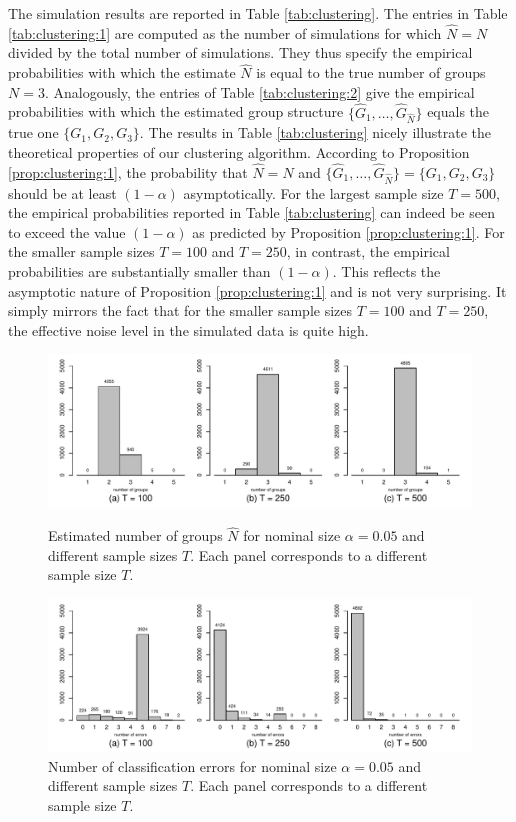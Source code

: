 \documentclass[a4paper,12pt]{article}
\begin{document}
The simulation results are reported in Table \ref{tab:clustering}. The entries in Table \ref{tab:clustering:1} are computed as the number of simulations for which $\widehat{N} = N$ divided by the total number of simulations. They thus specify the empirical probabilities with which the estimate $\widehat{N}$ is equal to the true number of groups $N = 3$. Analogously, the entries of Table \ref{tab:clustering:2} give the empirical probabilities with which the estimated group structure $\{ \widehat{G}_1,\ldots,\widehat{G}_{\widehat{N}}\}$ equals the true one $\{G_1,G_2,G_3\}$. The results in Table \ref{tab:clustering} nicely illustrate the theoretical properties of our clustering algorithm. According to Proposition \ref{prop:clustering:1}, the probability that $\widehat{N} = N$ and $\{ \widehat{G}_1,\ldots,\widehat{G}_{\widehat{N}}\} = \{G_1,G_2,G_3\}$ should be at least $(1-\alpha)$ asymptotically. For the largest sample size $T = 500$, the empirical probabilities reported in Table \ref{tab:clustering} can indeed be seen to exceed the value $(1-\alpha)$ as predicted by Proposition \ref{prop:clustering:1}. For the smaller sample sizes $T=100$ and $T=250$, in contrast, the empirical probabilities are substantially smaller than $(1-\alpha)$. This reflects the asymptotic nature of Proposition \ref{prop:clustering:1} and is not very surprising. It simply mirrors the fact that for the smaller sample sizes $T=100$ and $T=250$, the effective noise level in the simulated data is quite high.


\begin{figure}[t!]
\centering
\includegraphics[width=\textwidth]{output/plots/sim/histograms_groups}
\caption{Estimated number of groups $\widehat{N}$ for nominal size $\alpha = 0.05$ and different sample sizes $T$. Each panel corresponds to a different sample size $T$.}\label{fig:clustering:1}
\vspace{0.25cm}

\includegraphics[width=\textwidth]{output/plots/sim/histograms_errors}
\caption{Number of classification errors for nominal size $\alpha = 0.05$ and different sample sizes $T$. Each panel corresponds to a different sample size $T$.}\label{fig:clustering:2}
\end{figure}
\end{document}
